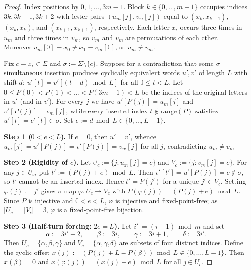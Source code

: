 \documentclass[11pt]{article}
\begin{document}
\begin{proof}
Index positions by $0, 1, \dots, 3m - 1$. Block $k \in \{0, \dots, m - 1\}$
occupies indices $3k, 3k + 1, 3k + 2$ with letter pairs $(u_m[j], v_m[j])$
equal to $(x_k, x_{k+1})$, $(x_k, x_k)$, and $(x_{k+1}, x_{k+1})$, respectively.
Each letter $x_i$ occurs three times in $u_m$ and three times in $v_m$, so
$u_m$ and $v_m$ are permutations of each other. Moreover $u_m[0] = x_0 \ne x_1
= v_m[0]$, so $u_m \ne v_m$.

Fix $c = x_i \in \Sigma$ and $\sigma := \Sigma \setminus \{c\}$. Suppose for a
contradiction that some $\sigma$-simultaneous insertion produces cyclically
equivalent words $u', v'$ of length $L$ with shift $d$:
$u'[t] = v'[(t + d) \bmod L]$ for all $0 \le t < L$. Let
$0 \le P(0) < P(1) < \dots < P(3m - 1) < L$ be the indices of the original
letters in $u'$ (and in $v'$). For every $j$ we have $u'[P(j)] = u_m[j]$ and
$v'[P(j)] = v_m[j]$, while every inserted index $t \notin \mathrm{range}(P)$
satisfies $u'[t] = v'[t] \in \sigma$. Set $e := d \bmod L \in \{0, \dots, L - 1\}$.

\medskip
\noindent\textbf{Step 1 ($0 < e < L$).}
If $e = 0$, then $u' = v'$, whence $u_m[j] = u'[P(j)] = v'[P(j)] = v_m[j]$ for
all $j$, contradicting $u_m \ne v_m$.

\medskip
\noindent\textbf{Step 2 (Rigidity of $c$).}
Let $U_c := \{j : u_m[j] = c\}$ and $V_c := \{j : v_m[j] = c\}$. For any
$j \in U_c$, put $t' := (P(j) + e) \bmod L$. Then
$v'[t'] = u'[P(j)] = c \notin \sigma$, so $t'$ cannot be an inserted index.
Hence $t' = P(j')$ for a unique $j' \in V_c$. Setting $\varphi(j) := j'$ gives
a map $\varphi : U_c \to V_c$ with $P(\varphi(j)) = (P(j) + e) \bmod L$. Since
$P$ is injective and $0 < e < L$, $\varphi$ is injective and fixed-point-free;
as $|U_c| = |V_c| = 3$, $\varphi$ is a fixed-point-free bijection.

\medskip
\noindent\textbf{Step 3 (Half-turn forcing: $2e = L$).}
Let $i' := (i - 1) \bmod m$ and set
\[
\alpha := 3i' + 2, \qquad \beta := 3i, \qquad \gamma := 3i + 1, \qquad
\delta := 3i'.
\]
Then $U_c = \{\alpha, \beta, \gamma\}$ and $V_c = \{\alpha, \gamma, \delta\}$
are subsets of four distinct indices. Define the cyclic offset
$x(j) := (P(j) + L - P(\beta)) \bmod L \in \{0, \dots, L - 1\}$. Then
$x(\beta) = 0$ and $x(\varphi(j)) = (x(j) + e) \bmod L$ for all $j \in U_c$.


\end{proof}
\end{document}
